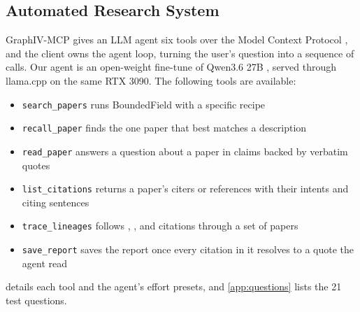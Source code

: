 \subsection{Automated Research System}
\label{sec:mcp}

GraphIV-MCP gives an LLM agent six tools over the Model Context Protocol \citep{anthropic2024mcp}, and the client owns the agent loop, turning the user's question into a sequence of calls. Our agent is an open-weight fine-tune of Qwen3.6 27B \citep{qwen2026qwen36}, served through llama.cpp \citep{gerganov2023llamacpp} on the same RTX 3090. The following tools are available:
\begin{itemize}
    \item \texttt{search\_papers} runs BoundedField with a specific recipe
    \item \texttt{recall\_paper} finds the one paper that best matches a description
    \item \texttt{read\_paper} answers a question about a paper in claims backed by verbatim quotes
    \item \texttt{list\_citations} returns a paper's citers or references with their intents and citing sentences
    \item \texttt{trace\_lineages} follows , , and  citations through a set of papers
    \item \texttt{save\_report} saves the report once every citation in it resolves to a quote the agent read
\end{itemize}
 details each tool and the agent's effort presets, and \cref{app:questions} lists the 21 test questions.
